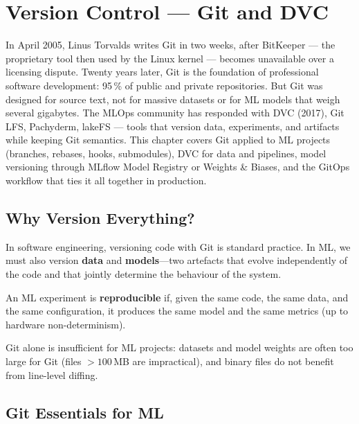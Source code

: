 \chapter{Version Control --- Git and DVC}
\label{ch:version-control}

In April 2005, Linus Torvalds writes Git in two weeks, after BitKeeper --- the proprietary tool then used by the Linux kernel --- becomes unavailable over a licensing dispute. Twenty years later, Git is the foundation of professional software development: 95\,\% of public and private repositories. But Git was designed for source text, not for massive datasets or for ML models that weigh several gigabytes. The MLOps community has responded with DVC (2017), Git LFS, Pachyderm, lakeFS --- tools that version data, experiments, and artifacts while keeping Git semantics. This chapter covers Git applied to ML projects (branches, rebases, hooks, submodules), DVC for data and pipelines, model versioning through MLflow Model Registry or Weights \& Biases, and the GitOps workflow that ties it all together in production.

\section{Why Version Everything?}
\label{sec:why-version}

In software engineering, versioning code with Git is standard practice.
In ML, we must also version \textbf{data} and \textbf{models}---two
artefacts that evolve independently of the code and that jointly determine
the behaviour of the system.

\begin{definition}[Reproducibility]
An ML experiment is \textbf{reproducible} if, given
the same code, the same data, and the same configuration, it produces the
same model and the same metrics (up to hardware non-determinism).
\end{definition}

\begin{remark}
Git alone is insufficient for ML projects: datasets and model weights are
often too large for Git (files $>100$\,MB are impractical), and binary
files do not benefit from line-level diffing.
\end{remark}

\section{Git Essentials for ML}
\label{sec:git-essentials}


